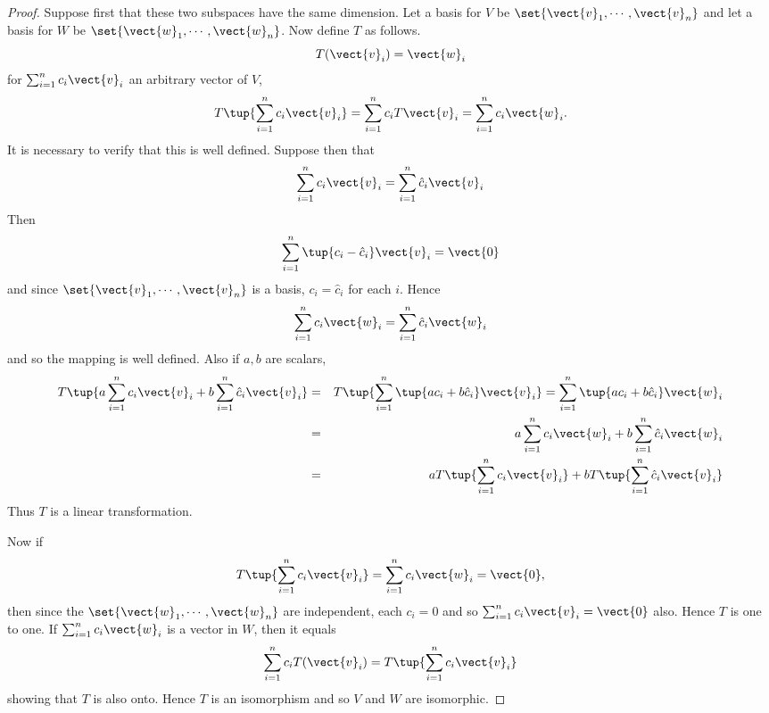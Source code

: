 \begin{proof} Suppose first that these two subspaces have the same
dimension. Let a basis for $V$ be $\set{
\vect{v}_{1},\cdots ,\vect{v}_{n}} $ and let a basis for $W$ be $
\set{\vect{w}_{1},\cdots ,\vect{w}_{n}}$. Now define $T$ as
follows. 
\begin{equation*}
T(\vect{v}_{i})=\vect{w}_{i}
\end{equation*}
for $\sum_{i=1}^{n}c_{i}\vect{v}_{i}$ an arbitrary vector of $V$,
\begin{equation*}
T\tup{\sum_{i=1}^{n}c_{i}\vect{v}_{i}} = \sum_{i=1}^{n}c_{i}T
\vect{v}_{i}=\sum_{i=1}^{n}c_{i}\vect{w}_{i}.
\end{equation*}
It is necessary to verify that this is well defined. Suppose then that 
\begin{equation*}
\sum_{i=1}^{n}c_{i}\vect{v}_{i}=\sum_{i=1}^{n}\hat{c}_{i}\vect{v}_{i}
\end{equation*}
Then 
\begin{equation*}
\sum_{i=1}^{n}\tup{c_{i}-\hat{c}_{i}} \vect{v}_{i}=\vect{0}
\end{equation*}
and since $\set{\vect{v}_{1},\cdots ,\vect{v}_{n}} $ is a basis, $
c_{i}=\hat{c}_{i}$ for each $i$. Hence 
\begin{equation*}
\sum_{i=1}^{n}c_{i}\vect{w}_{i}=\sum_{i=1}^{n}\hat{c}_{i}\vect{w}_{i}
\end{equation*}
and so the mapping is well defined. Also if $a,b$ are scalars, 
\begin{eqnarray*}
T\tup{a\sum_{i=1}^{n}c_{i}\vect{v}_{i}+b\sum_{i=1}^{n}\hat{c}_{i}\vect{v}%
_{i}} &=&T\tup{\sum_{i=1}^{n}\tup{ac_{i}+b\hat{c}_{i}} \vect{v%
}_{i}} =\sum_{i=1}^{n}\tup{ac_{i}+b\hat{c}_{i}} \vect{w}_{i} \\
&=&a\sum_{i=1}^{n}c_{i}\vect{w}_{i}+b\sum_{i=1}^{n}\hat{c}_{i}\vect{w}_{i} \\
&=&aT\tup{\sum_{i=1}^{n}c_{i}\vect{v}_{i}} +bT\tup{\sum_{i=1}^{n}%
\hat{c}_{i}\vect{v}_{i}}
\end{eqnarray*}
Thus $T$ is a linear transformation. 

Now if 
\begin{equation*}
T\tup{\sum_{i=1}^{n}c_{i}\vect{v}_{i}} =\sum_{i=1}^{n}c_{i}\vect{w}%
_{i}=\vect{0},
\end{equation*}
then since the $\set{\vect{w}_{1},\cdots ,\vect{w}_{n}} $ are
independent, each $c_{i}=0$ and so $\sum_{i=1}^{n}c_{i}\vect{v}_{i}=\vect{0}$
also. Hence $T$ is one to one. If $\sum_{i=1}^{n}c_{i}\vect{w}_{i}$ is a
vector in $W$, then it equals 
\begin{equation*}
\sum_{i=1}^{n}c_{i}T(\vect{v}_{i})=T\tup{\sum_{i=1}^{n}c_{i}\vect{v}_{i}}
\end{equation*}
showing that $T$ is also onto. Hence $T$ is an isomorphism and so $V$ and $W$
are isomorphic.


\end{proof}
